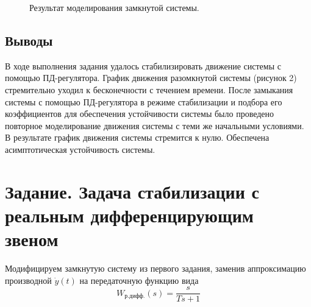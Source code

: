 \documentclass[a5paper, 10pt]{article}
\theoremstyle{definition}
\theoremstyle{plain}
\theoremstyle{remark}
\begin{document}
\begin{figure}[h!]
\caption{Результат моделирования замкнутой системы.}
\end{figure}

\subsection{Выводы}
В ходе выполнения задания удалось стабилизировать движение системы с помощью ПД-регулятора. График движения разомкнутой системы (рисунок 2) стремительно уходил к бесконечности с течением времени. После замыкания системы с помощью ПД-регулятора в режиме стабилизации и подбора его коэффициентов для обеспечения устойчивости системы было проведено повторное моделирование движения системы с теми же начальными условиями. В результате график движения системы стремится к нулю. Обеспечена асимптотическая устойчивость системы.

\newpage
\section{Задание. Задача стабилизации с реальным дифференцирующим звеном}
Модифицируем замкнутую систему из первого задания, заменив аппроксимацию производной $\dot{y} (t)$ на передаточную функцию вида
\begin{equation}
W_{\text{р.дифф.}} (s) = \frac{s}{Ts + 1}
\end{equation}









\newpage
\end{document}
